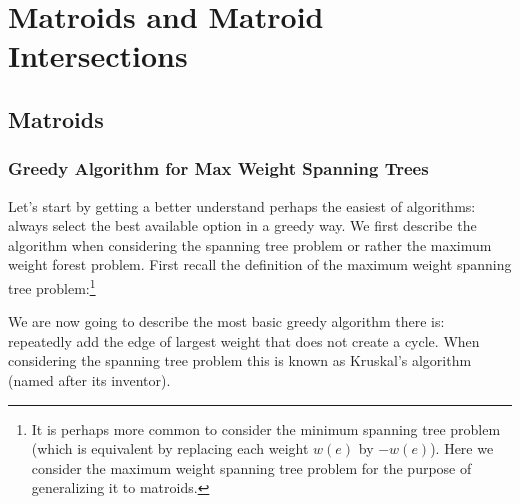 % 

\chapter{Matroids and Matroid Intersections}

\section{Matroids}
\subsection{Greedy Algorithm for Max Weight Spanning Trees}

Let's start by getting a better understand perhaps the easiest of algorithms: always select the
best available option in a greedy way. We first describe the algorithm when considering the
spanning tree problem or rather the maximum weight forest problem. First recall the definition
of the maximum weight spanning tree problem:\footnote{It is perhaps more common to consider the
minimum spanning tree problem (which is equivalent by replacing each weight $w(e)$ by $-w(e)$).
Here we consider the maximum weight spanning tree problem for the purpose of generalizing it to
matroids.}



We are now going to describe the most basic greedy algorithm there is: repeatedly add the edge of
largest weight that does not create a cycle. When considering the spanning tree problem this is
known as Kruskal's algorithm (named after its inventor).


